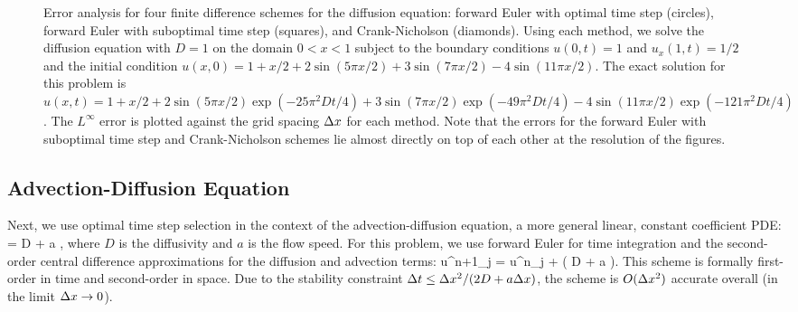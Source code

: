 \documentclass[oneeqnum,onefignum,onetabnum,onethmnum]{siamltex}
\begin{document}
\begin{figure}[htb]
\begin{center}
\caption{Error analysis for four finite difference schemes for the 
diffusion equation: forward Euler with optimal time step (circles), forward 
Euler with suboptimal time step (squares), and Crank-Nicholson (diamonds).  
Using each method, we solve the diffusion equation with $D = 1$ on the 
domain $0 < x < 1$ subject to the boundary conditions 
$u(0,t) = 1$ and $u_x(1,t) = 1/2$ 
and the initial condition
$u(x,0) = 1 + x/2 + 2 \sin(5 \pi x/2) + 3 \sin(7 \pi x/2) 
- 4 \sin(11 \pi x/2)$.  
The exact solution for this problem is
$u(x,t) = 1 + x/2 
        + 2 \sin(5 \pi x/2)  \exp(-25 \pi^2 D t/4) 
        + 3 \sin(7 \pi x/2)  \exp(-49 \pi^2 D t/4)
        - 4 \sin(11 \pi x/2) \exp(-121 \pi^2 D t/4)$.
The $L^\infty$ error is plotted against the grid spacing $\Delta x$ for each 
method.  Note that the errors for the forward Euler with suboptimal time 
step and Crank-Nicholson schemes lie almost directly on top of each other
at the resolution of the figures.
}
\label{fig:diffusion_eqn_1d_src_error}
\end{center}
\end{figure}


\subsection{Advection-Diffusion Equation}
Next, we use optimal time step selection in the context of the 
advection-diffusion equation, a more general linear, constant coefficient PDE:
\beq
   = D  
  + a ,
  \label{eq:ADE_1d}
\eeq
where $D$ is the diffusivity and $a$ is the flow speed.  For this problem,
we use forward Euler for time integration and the second-order central 
difference approximations for the diffusion and advection terms:
\beq
  u^{n+1}_j = u^{n}_j 
  + \dt 
    \left( D  
         + a  \right).
  \label{eq:ADE_1d_FD_scheme}
\eeq
This scheme is formally first-order in time and second-order in space.  
Due to the stability constraint $\Delta t \le \Delta x^2/(2 D + a \Delta x)$, the 
scheme is $O(\Delta x^2)$ accurate overall (in the limit $\Delta x \rightarrow 0$).
\end{document}
